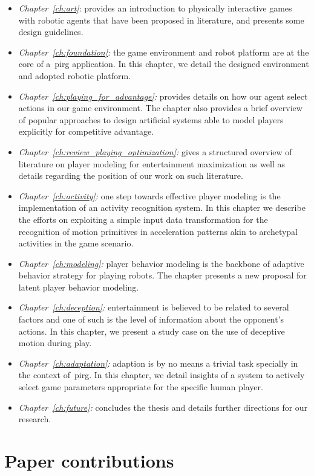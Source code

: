 \begin{itemize}
\item\emph{Chapter~\ref{ch:art}}: provides an introduction to physically interactive games with robotic agents that have been proposed in literature, and presents some design guidelines. 
\item\emph{Chapter~\ref{ch:foundation}:} the game environment and robot platform are at the core of a~\gls{pirg} application. In this chapter, we detail the designed environment and adopted robotic platform.
\item\emph{Chapter~\ref{ch:playing_for_advantage}:} provides details on how our agent select actions in our game environment. The chapter also provides a brief overview of popular approaches to design artificial systems able to model players explicitly for competitive advantage. 
\item\emph{Chapter~\ref{ch:review_playing_optimization}:} gives a structured overview of literature on player modeling for entertainment maximization as well as details regarding the position of our work on such literature.
\item\emph{Chapter~\ref{ch:activity}:} one step towards effective player modeling is the implementation of an activity recognition system. In this chapter we describe the efforts on exploiting a simple input data transformation for the recognition of motion primitives in acceleration patterns akin to archetypal activities in the game scenario.
\item\emph{Chapter~\ref{ch:modeling}:} player behavior modeling is the backbone of adaptive behavior strategy for playing robots. The chapter presents a new proposal for latent player behavior modeling.
\item\emph{Chapter~\ref{ch:deception}:} entertainment is believed to be related to several factors and one of such is the level of information about the opponent's actions. In this chapter, we present a study case on the use of deceptive motion during play.
\item\emph{Chapter~\ref{ch:adaptation}:} adaption is by no means a trivial task specially in the context of~\gls{pirg}. In this chapter, we detail insights of a system to actively select game parameters appropriate for the specific human player.
\item\emph{Chapter~\ref{ch:future}:} concludes the thesis and details further directions for our research.
\end{itemize}

\section{Paper contributions}

